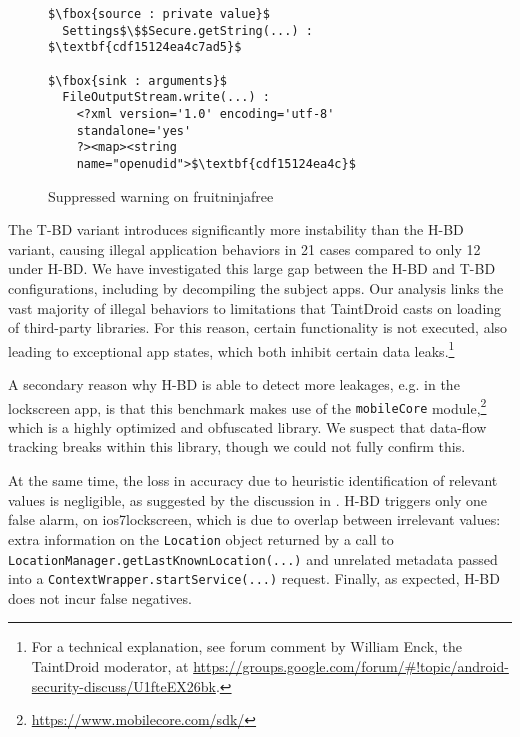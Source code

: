 \begin{figure}
\begin{lstlisting}[numbers=none]
$\fbox{source : private value}$
  Settings$\$$Secure.getString(...) : $\textbf{cdf15124ea4c7ad5}$

$\fbox{sink : arguments}$
  FileOutputStream.write(...) :
    <?xml version='1.0' encoding='utf-8'
    standalone='yes'
    ?><map><string
    name="openudid">$\textbf{cdf15124ea4c}$
\end{lstlisting}
\caption{\label{Fi:fruitninja}Suppressed warning on fruitninjafree}
\vspace{-0.1in}
\end{figure}


The T-BD variant introduces significantly more instability than the H-BD variant, causing illegal application behaviors in 21 cases compared to only 12 under H-BD. We have investigated this large gap between the H-BD and T-BD configurations, including by decompiling the subject apps. Our analysis links the vast majority of illegal behaviors to limitations that
TaintDroid casts on loading of third-party libraries. For this reason, certain functionality is not executed, also leading to exceptional app states, which both inhibit certain data leaks.\footnote{
	For a technical explanation, see forum comment by William Enck, the TaintDroid moderator, at \href{https://groups.google.com/forum/\#!topic/android-security-discuss/U1fteEX26bk}{https://groups.google.com/forum/\#!topic/android-security-discuss/U1fteEX26bk}.
}

A secondary reason why H-BD is able to detect more leakages, e.g. in the lockscreen app, is that this benchmark makes use of the {\tt mobileCore} module,\footnote{
\href{https://www.mobilecore.com/sdk/}{https://www.mobilecore.com/sdk/}
} which is a highly optimized and obfuscated library. We suspect that data-flow tracking breaks within this library, though we could not fully confirm this.

At the same time, the loss in accuracy due to heuristic identification of relevant values is negligible, as suggested by the discussion in . H-BD triggers only one false alarm, on  ios7lockscreen,
which is due to overlap between irrelevant values: extra information on the {\tt Location} object returned by a call to {\tt LocationManager.getLastKnownLocation(...)} and unrelated metadata passed into a {\tt ContextWrapper.startService(...)} request.  Finally, as expected, H-BD does not incur false negatives. 